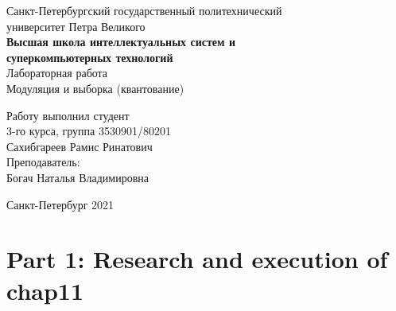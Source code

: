 \documentclass[a4paper]{article}
\begin{document}
    \begin{center}
        \begin{center}
        \hfill \break
        \normalsize{Санкт-Петербургский государственный политехнический}\\
        \normalsize{университет Петра Великого}\\
        \hfill \break
        \normalsize{\textbf{Высшая школа интеллектуальных систем и}}\\ 
        \normalsize{\textbf{суперкомпьютерных технологий}}\\ 
        \hfill \break
        \hfill \break
        \hfill \break
        \normalsize{Лабораторная работа}\\
        \hfill \break
        \hfill \break
        \normalsize{\LARGE Модуляция и выборка (квантование)}\\
        \end{center}
        \hfill \break
        \hfill \break
        \hfill \break
        \hfill \break
        \hfill \break
        \hfill \break
        \hfill \break
        \hfill \break
        \hfill \break
        \hfill \break
        \begin{flushright}
            \normalsize{Работу выполнил студент}\\
            \normalsize{3-го курса, группа 3530901/80201}\\
            \normalsize{Сахибгареев Рамис Ринатович}\\
            \hfill \break
            \normalsize{Преподаватель:}\\
            \normalsize{Богач Наталья Владимировна}\\
        \end{flushright}
        \hfill \break
        \hfill \break
        \hfill \break
        \hfill \break
        \begin{center} Санкт-Петербург 2021 \end{center}
        \thispagestyle{empty}
    \end{center}
    
    \newpage
        \tableofcontents
    
    \newpage
         \listoffigures
    
    \newpage
         \lstlistoflistings   
     
    \newpage
        \section{Part 1: Research and execution of chap11}
        
\end{document}
